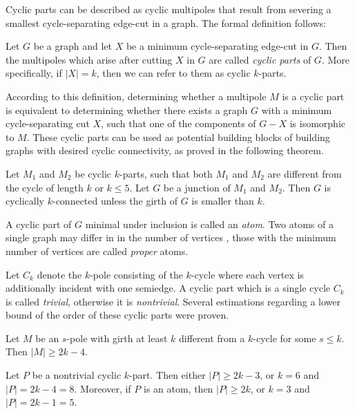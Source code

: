 \documentclass[12pt, twoside]{book}
\begin{document}
Cyclic parts can be described as cyclic multipoles that result from severing a smallest cycle-separating edge-cut in a graph. The formal definition follows:

\begin{definition}
	Let $G$ be a graph and let $X$ be a minimum cycle-separating edge-cut in $G$. Then the multipoles which arise after cutting $X$ in $G$ are called \textit{cyclic parts} of $G$. More specifically, if $|X|=k$, then we can refer to them as cyclic $k$-parts.
\end{definition}

According to this definition, determining whether a multipole $M$ is a cyclic part is equivalent to determining whether there exists a graph $G$ with a minimum cycle-separating cut $X$, such that one of the components of $G-X$ is isomorphic to $M$. These cyclic parts can be used as potential building blocks of building graphs with desired cyclic connectivity, as proved in the following theorem.

\begin{theorem}
	Let $M_1$ and $M_2$ be cyclic $k$-parts, such that both $M_1$ and $M_2$ are diﬀerent from the cycle of length $k$ or $k\leq 5$. Let $G$ be a junction of $M_1$ and $M_2$. Then $G$ is cyclically $k$-connected unless the girth of $G$ is smaller than $k$.
\end{theorem}

A cyclic part of $G$ minimal under inclusion is called an \textit{atom}. Two atoms of a single graph may differ in in the number of vertices \cite{atoms-of-cyclic}, those with the minimum number of vertices are called \textit{proper} atoms.

Let $C_k$ denote the $k$-pole consisting of the $k$-cycle where each vertex is additionally incident with one semiedge. A cyclic part which is a single cycle $C_k$ is called \textit{trivial}, otherwise it is \textit{nontrivial}. Several estimations regarding a lower bound of the order of these cyclic parts were proven.

\begin{lemma}\label{lem:rajnik5.1}
	Let $M$ be an $s$-pole with girth at least $k$ different from a $k$-cycle for some $s\leq k$. Then $|M| \geq 2k - 4$.
\end{lemma}

\begin{theorem}
	Let $P$ be a nontrivial cyclic $k$-part. Then either $|P|\geq 2k-3$, or $k = 6$ and $|P|= 2k-4 = 8$. Moreover, if $P$ is an atom, then $|P| \geq 2k$, or $k = 3$ and $|P| = 2k-1 = 5$.
\end{theorem}
\end{document}
